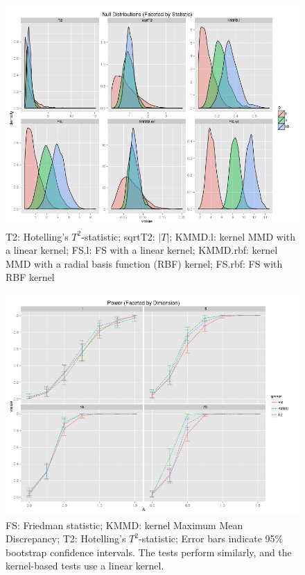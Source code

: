 \begin{figure}
  \centering
  \includegraphics[width=.8\linewidth]{null_dist.png}
  \caption{T2: Hotelling's $T^2$-statistic; sqrtT2: $|T|$;
    KMMD.l: kernel MMD with a linear kernel; FS.l: FS with a
  linear kernel; KMMD.rbf: kernel MMD with a radial basis function (RBF) kernel;
  FS.rbf: FS with RBF kernel}
  \label{fig:null_dist}
\end{figure}

\begin{figure}
  \centering
  \includegraphics[width=\linewidth]{power_normal.png}
  \caption{FS: Friedman statistic; KMMD: kernel Maximum Mean
    Discrepancy; T2: Hotelling's $T^2$-statistic; Error bars indicate
    95\% bootstrap confidence intervals.  The tests perform similarly,
    and the kernel-based tests use a linear kernel.}
  \label{fig:power_normal}
\end{figure}

